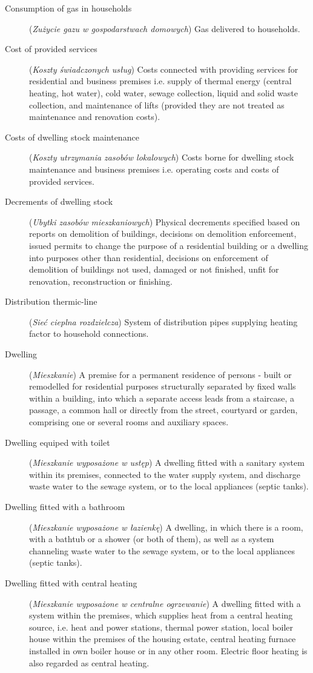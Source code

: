 \documentclass[12pt,a4paper]{article}
\begin{document}
\begin{description}
\item[Consumption of gas in households] (\textit{Zużycie gazu w gospodarstwach domowych}) Gas delivered to households.
\item[Cost of provided services] (\textit{Koszty świadczonych usług}) Costs connected with providing services for residential and business premises i.e. supply of thermal energy (central heating, hot water), cold water, sewage collection, liquid and solid waste collection, and maintenance of lifts (provided they are not treated as maintenance and renovation costs).
\item[Costs of dwelling stock maintenance] (\textit{Koszty utrzymania zasobów lokalowych}) Costs borne for dwelling stock maintenance and business premises i.e. operating costs and costs of provided services.
\item[Decrements of dwelling stock] (\textit{Ubytki zasobów mieszkaniowych}) Physical decrements specified based on reports on demolition of buildings, decisions on demolition enforcement, issued permits to change the purpose of a residential building or a dwelling into purposes other than residential, decisions on enforcement of demolition of buildings not used, damaged or not finished, unfit for renovation, reconstruction or finishing.
\item[Distribution thermic-line] (\textit{Sieć cieplna rozdzielcza}) System of distribution pipes supplying heating factor to household connections.
\item[Dwelling] (\textit{Mieszkanie}) A premise for a permanent residence of persons - built or remodelled for residential purposes structurally separated by fixed walls within a building, into which a separate access leads from a staircase, a passage, a common hall or directly from the street, courtyard or garden, comprising one or several rooms and auxiliary spaces.
\item[Dwelling equiped with toilet] (\textit{Mieszkanie wyposażone w ustęp}) A dwelling fitted with a sanitary system within its premises, connected to the water supply system, and discharge waste water to the sewage system, or to the local appliances (septic tanks).
\item[Dwelling fitted with a bathroom] (\textit{Mieszkanie wyposażone w łazienkę}) A dwelling, in which there is a room, with a bathtub or a shower (or both of them), as well as a system channeling waste water to the sewage system, or to the local appliances (septic tanks).
\item[Dwelling fitted with central heating] (\textit{Mieszkanie wyposażone w centralne ogrzewanie}) A dwelling fitted with a system within the premises, which supplies heat from a central heating source, i.e. heat and power stations, thermal power station, local boiler house within the premises of the housing estate, central heating furnace installed in own boiler house or in any other room. Electric floor heating is also regarded as central heating.

\end{description}
\end{document}
